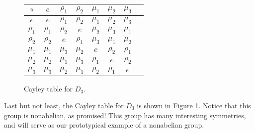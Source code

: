 \begin{figure}[ht]
\centering
\begin{tabular}{c | c c c c c c c}
    $\circ$  & $e$      & $\rho_1$ & $\rho_2$ & $\mu_1$  & $\mu_2$  & $\mu_3$ \\
    \hline
    $e$      & $e$      & $\rho_1$ & $\rho_2$ & $\mu_1$  & $\mu_2$  & $\mu_3$ \\
    $\rho_1$ & $\rho_1$ & $\rho_2$ & $e$      & $\mu_2$  & $\mu_3$  & $\mu_1$ \\
    $\rho_2$ & $\rho_2$ & $e$      & $\rho_1$ & $\mu_3$  & $\mu_1$  & $\mu_2$ \\
    $\mu_1$  & $\mu_1$  & $\mu_3$  & $\mu_2$  & $e$      & $\rho_2$ & $\rho_1$\\
    $\mu_2$  & $\mu_2$  & $\mu_1$  & $\mu_3$  & $\rho_1$ & $e$      & $\rho_2$\\
    $\mu_3$  & $\mu_3$  & $\mu_2$  & $\mu_1$  & $\rho_2$ & $\rho_1$ & $e$     \\
\end{tabular}
\caption{Cayley table for $D_3$.}
\label{cayleyD3}
\end{figure}

Last but not least, the Cayley table for $D_3$ is shown in Figure \ref{cayleyD3}. Notice that this group is nonabelian, as promised! This group has many interesting symmetries, and will serve as our prototypical example of a nonabelian group.
